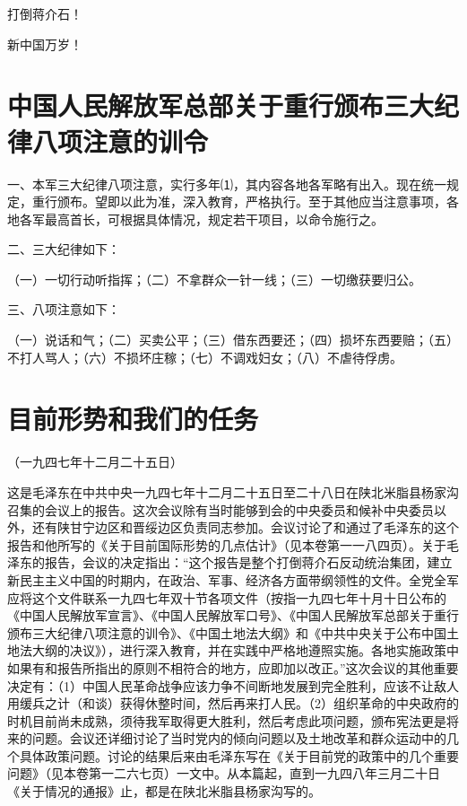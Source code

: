 \documentclass[UTF-8, a5paper, 12pt]{ctexart}
\begin{document}
打倒蒋介石！

新中国万岁！

\section{中国人民解放军总部关于重行颁布三大纪律八项注意的训令}

一、本军三大纪律八项注意，实行多年⑴，其内容各地各军略有出入。现在统一规定，重行颁布。望即以此为准，深入教育，严格执行。至于其他应当注意事项，各地各军最高首长，可根据具体情况，规定若干项目，以命令施行之。

二、三大纪律如下：

（一）一切行动听指挥；（二）不拿群众一针一线；（三）一切缴获要归公。

三、八项注意如下：

（一）说话和气；（二）买卖公平；（三）借东西要还；（四）损坏东西要赔；（五）不打人骂人；（六）不损坏庄稼；（七）不调戏妇女；（八）不虐待俘虏。


\section{目前形势和我们的任务}

（一九四七年十二月二十五日）

这是毛泽东在中共中央一九四七年十二月二十五日至二十八日在陕北米脂县杨家沟召集的会议上的报告。这次会议除有当时能够到会的中央委员和候补中央委员以外，还有陕甘宁边区和晋绥边区负责同志参加。会议讨论了和通过了毛泽东的这个报告和他所写的《关于目前国际形势的几点估计》（见本卷第一一八四页）。关于毛泽东的报告，会议的决定指出：“这个报告是整个打倒蒋介石反动统治集团，建立新民主主义中国的时期内，在政治、军事、经济各方面带纲领性的文件。全党全军应将这个文件联系一九四七年双十节各项文件（按指一九四七年十月十日公布的《中国人民解放军宣言》、《中国人民解放军口号》、《中国人民解放军总部关于重行颁布三大纪律八项注意的训令》、《中国土地法大纲》和《中共中央关于公布中国土地法大纲的决议》），进行深入教育，并在实践中严格地遵照实施。各地实施政策中如果有和报告所指出的原则不相符合的地方，应即加以改正。”这次会议的其他重要决定有：（1）中国人民革命战争应该力争不间断地发展到完全胜利，应该不让敌人用缓兵之计（和谈）获得休整时间，然后再来打人民。（2）组织革命的中央政府的时机目前尚未成熟，须待我军取得更大胜利，然后考虑此项问题，颁布宪法更是将来的问题。会议还详细讨论了当时党内的倾向问题以及土地改革和群众运动中的几个具体政策问题。讨论的结果后来由毛泽东写在《关于目前党的政策中的几个重要问题》（见本卷第一二六七页）一文中。从本篇起，直到一九四八年三月二十日《关于情况的通报》止，都是在陕北米脂县杨家沟写的。
\end{document}
